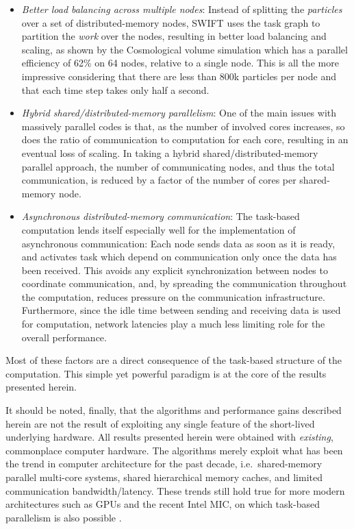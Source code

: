 \documentclass[final]{siamltex}
\begin{document}
\begin{itemize}
    \item {\em Better load balancing across multiple nodes}: Instead of
        splitting the {\em particles} over a set of distributed-memory nodes,
        SWIFT uses the task graph to partition the {\em work} over
        the nodes, resulting
        in better load balancing and scaling, as shown by the Cosmological
        volume simulation which has a parallel efficiency of 62\% on 64
        nodes, relative to a single node.
        This is all the more impressive considering that there are less than
        800k particles per node and that each time step takes only half
        a second.
    
    \item {\em Hybrid shared/distributed-memory parallelism}: One of the
        main issues with massively parallel codes is that, as the number
        of involved cores increases, so does the ratio of communication
        to computation for each core, resulting in an eventual loss of scaling.
        In taking a hybrid shared/distributed-memory parallel approach,
        the number of communicating nodes, and thus the total communication,
        is reduced by a factor of the number of cores per shared-memory node.
        
    \item {\em Asynchronous distributed-memory communication}: The task-based
        computation lends itself especially well for the implementation
        of asynchronous communication: Each node sends data as soon
        as it is ready, and activates task which depend on communication
        only once the data has been received.
        This avoids any explicit synchronization between nodes to coordinate
        communication, and, by spreading the communication throughout the
        computation, reduces pressure on the communication infrastructure.
        Furthermore, since the idle time between sending and receiving
        data is used for computation, network latencies play a much
        less limiting role for the overall performance.
    
\end{itemize}

Most of these factors are a direct consequence of the task-based
structure of the computation.
This simple yet powerful paradigm is at the core of the results
presented herein.

It should be noted, finally, that the algorithms and performance gains
described herein are not the result of exploiting any single feature
of the short-lived underlying hardware.
All results presented herein were obtained with {\em existing}, commonplace
computer hardware.
The algorithms merely exploit what has been the trend in computer
architecture for the past decade, i.e.~shared-memory parallel multi-core
systems, shared hierarchical memory caches, and limited communication
bandwidth/latency.
These trends still hold true for more modern architectures such as
GPUs and the recent Intel MIC, on which task-based parallelism
is also possible \cite{ref:Chalk2014}.
\end{document}
